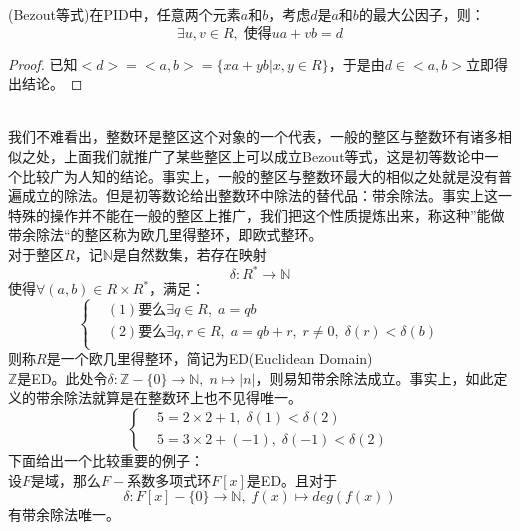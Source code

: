 (Bezout等式)在PID中，任意两个元素$a$和$b$，考虑$d$是$a$和$b$的最大公因子，则：
\[
\exists u,v\in R,\; \text{使得}ua+vb=d
\]
\begin{proof}
已知$<d>=<a,b>=\{xa+yb|x,y\in R\}$，于是由$d\in <a,b>$立即得出结论。
\end{proof}
\\
\indent 我们不难看出，整数环是整区这个对象的一个代表，一般的整区与整数环有诸多相似之处，上面我们就推广了某些整区上可以成立Bezout等式，这是初等数论中一个比较广为人知的结论。事实上，一般的整区与整数环最大的相似之处就是没有普遍成立的除法。但是初等数论给出整数环中除法的替代品：带余除法。事实上这一特殊的操作并不能在一般的整区上推广，我们把这个性质提炼出来，称这种”能做带余除法“的整区称为欧几里得整环，即欧式整环。\\
对于整区$R$，记$\mathbb{N}$是自然数集，若存在映射
\[
\delta\colon R^*\to \mathbb{N}
\]
使得$\forall (a,b)\in R\times R^*$，满足：
\[\left\{
\begin{aligned}
&(1)\text{要么}\exists q\in R,\; a=qb\\
&(2)\text{要么}\exists q,r\in R,\;a=qb+r,\; r\neq 0,\; \delta(r)<\delta(b)\\
\end{aligned}\right.\]
则称$R$是一个欧几里得整环，简记为ED(Euclidean Domain)\\
$\mathbb{Z}$是ED。此处令$\delta\colon \mathbb{Z}-\{0\}\to \mathbb{N},\; n\mapsto |n|$，则易知带余除法成立。事实上，如此定义的带余除法就算是在整数环上也不见得唯一。
\[
\left\{
\begin{aligned}
&5=2\times 2+1,\; \delta(1)<\delta(2)\\
&5=3\times 2+(-1),\; \delta(-1)<\delta(2)
\end{aligned}\right.
\]
下面给出一个比较重要的例子：\\
设$F$是域，那么$F-$系数多项式环$F[x]$是ED。且对于
\[
\delta\colon F[x]-\{0\}\to \mathbb{N},\; f(x)\mapsto deg(f(x))
\]
有带余除法唯一。
